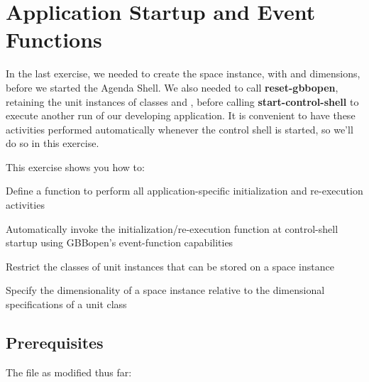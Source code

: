 \documentclass[10pt,twoside,english,pdftex]{article}
\begin{document}
\section{Application Startup and Event Functions}
\label{sec:application-startup}%

In the last exercise, we needed to create the  space
instance, with  and  dimensions, before we started the
Agenda Shell.  We also needed to call \textbf{reset-gbbopen},
retaining the unit instances of classes  and
, before calling
\textbf{start-control-shell} to execute another run of our developing
application.  It is convenient to have these activities performed
automatically whenever the control shell is started, so we'll do so in
this exercise.

\fndocrule

This exercise shows you how to:
\begin{tightitemize}
\item Define a function to perform all application-specific
  initialization and re-execution activities
\item Automatically invoke the initialization/re-execution function at 
  control-shell startup using GBBopen's event-function capabilities
\item Restrict the classes of unit instances that can be stored on a space 
  instance
\item Specify the dimensionality of a space instance relative to the
  dimensional specifications of a unit class
\end{tightitemize}

\fndocrule

\subsection*{Prerequisites}

\begin{tightitemize}
\item The  file as modified thus far:
\end{tightitemize}
\end{document}
